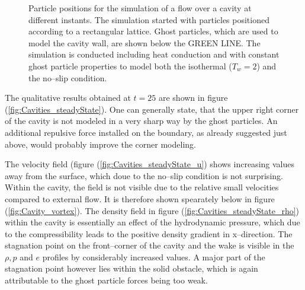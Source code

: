 \documentclass{report}
\begin{document}
\begin{figure}[!htbp]
{}

\caption[particle positions for Cavity]{Particle positions for the simulation of a flow over a cavity at different instants. The simulation started with particles positioned according to a rectangular lattice. Ghost particles, which are used to model the cavity wall, are shown below the GREEN LINE. The simulation is conducted including heat conduction and with constant ghost particle properties to model both the isothermal ($T_w=2$) and the no--slip condition.}

\end{figure}



The qualitative results obtained at $t=25$ are shown in figure (\ref{fig:Cavities_steadyState}). One can generally state, that the upper right corner of the cavity is not modeled in a very sharp way by the ghost particles. An additional repulsive force installed on the boundary, as already suggested just above, would probably improve the corner modeling. 

The velocity field (figure (\ref{fig:Cavities_steadyState_u}) shows increasing values away from the surface, which doue to the no--slip condition is not surprising. Within the cavity, the field is not visible due to the relative small velocities compared to external flow. It is therefore shown spearately below in figure (\ref{fig:Cavity_vortex}). The density field in figure (\ref{fig:Cavities_steadyState_rho}) within the cavity is essentially an effect of the hydrodynamic pressure, which due to the compressibility leads to the positive density gradient in x--direction. The stagnation point on the front--corner of the cavity and the wake is visible in the $\rho, p$ and $e$ profiles by considerably increased values. A major part of the stagnation point however lies within the solid obstacle, which is again attributable to the ghost particle forces being too weak.
\end{document}
